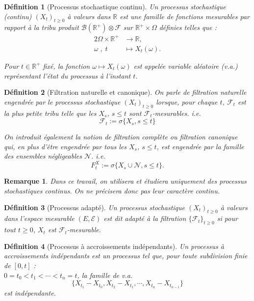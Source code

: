 \documentclass[openany]{book}
\newcommand{\F}{\mathscr{F}}
\newcommand{\N}{\mathscr{N}}
\newcommand{\carE}{\mathscr{E}}
\newcommand{\R}{\mathbb{R}}
\newcommand{\1}{\mathbbm{1}}
\theoremstyle{thmfont}
\theoremstyle{deffont}
\newtheorem{definition}[definition]{Définition}
\theoremstyle{thmfont}
\theoremstyle{deffont}
\newtheorem{remark}[remark]{Remarque}
\begin{document}
\begin{definition}[Processus stochastique continu]
  Un \textit{processus stochastique (continu)} $(X_t)_{t \ge 0}$ à valeurs dans $\mathbb{R}$ est une famille de fonctions mesurables par rapport à la tribu produit $\mathcal{B}(\mathbb{R}^+) \otimes \mathcal{F}$ sur $\mathbb{R}^+ \times \Omega$ définies telles que :
  \begin{alignat*}{2}
    \Omega\times \R^+ &\rightarrow \R, \\
    \omega\;,\; t\quad &\mapsto X_t(\omega).
  \end{alignat*}
  
  Pour $t \in \mathbb{R}^+$ fixé, la fonction $\omega \mapsto X_t(\omega)$ est appelée \textit{variable aléatoire} (v.a.) représentant l’état du processus à l’instant $t$.
\end{definition}

\begin{definition}[Filtration naturelle et canonique]
  On parle de \textit{filtration naturelle} engendrée par le processus stochastique $(X_t)_{t\geq0}$ lorsque, pour chaque $t$, $\F_t$ est la plus petite tribu telle que les $X_s$, $s\leq t$ sont $\F_t$-mesurables. i.e.
$$\F_t := \sigma\{X_s, s\leq t\}$$

On introduit également la notion de \textit{filtration complète} ou
\textit{filtration canonique} qui, en plus d'être engendrée par tous les $X_s$, $s \leq t$, est engendrée par la famille des ensembles négligeables $\N$. i.e.
$$F^X_t := \sigma\{X_s\cup \N, s\leq t\}.$$
\end{definition}

\begin{remark} Dans ce travail, on utilisera et étudiera uniquement des processus stochastiques continus. On ne précisera donc pas leur caractère continu.
\end{remark}

\begin{definition}[Processus adapté] Un processus stochastique $(X_t)_{t\ge0}$ à valeurs dans l'espace mesurable $(E, \carE)$ est dit \textit{adapté} à la filtration $\{\F_t\}_{t\geq0}$ si pour tout $t\geq0$, $X_t$ est $\F_t$-mesurable.
\label{def:pr_adapte}
\end{definition}
  

\begin{definition}[Processus à accroissements indépendants]
  \label{def:pr_accr_indep} Un processus à \textit{accroissements indépendants} est un processus tel que, pour toute subdivision finie de $[0,t]$ :\\  $0 = t_0 < t_1 < \cdots < t_n = t$, la famille de v.a.
    $$\{X_{t_1} - X_{t_0}, X_{t_2} - X_{t_1}, \cdots ,X_{t_n} - X_{t_{n-1}}\}$$
    est indépendante.
  \end{definition}
\end{document}
